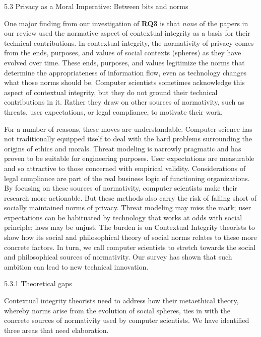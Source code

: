\documentclass[../thesis.tex]{subfiles}
\begin{document}
5.3 Privacy as a Moral Imperative: Between bits and norms

\textcolor[rgb]{0.2,0.2,0.2}{One major finding from our investigation of
}\textbf{\textcolor[rgb]{0.2,0.2,0.2}{RQ3}}\textcolor[rgb]{0.2,0.2,0.2}{
is that }\textit{\textcolor[rgb]{0.2,0.2,0.2}{none}} of the papers in
our review used the normative aspect of contextual integrity as a basis
for their technical contributions. In contextual integrity, the
normativity of privacy comes from the ends, purposes, and values of
social contexts (spheres) as they have evolved over time. These ends,
purposes, and values legitimize the norms that determine the
appropriateness of information flow, even as technology changes what
those norms should be. Computer scientists sometimes acknowledge this
aspect of contextual integrity, but they do not ground their technical
contributions in it. Rather they draw on other sources of normativity,
such as threats, user expectations, or legal compliance, to motivate
their work.

For a number of reasons, these moves are understandable. Computer
science has not traditionally equipped itself to deal with the hard
problems surrounding the origins of ethics and morals. Threat modeling
is narrowly pragmatic and has proven to be suitable for engineering
purposes. User expectations are measurable and so attractive to those
concerned with empirical validity. Considerations of legal compliance
are part of the real business logic of functioning organizations. By
focusing on these sources of normativity, computer scientists make
their research more actionable. But these methods also carry the risk
of falling short of socially maintained norms of privacy. Threat
modeling may miss the mark; user expectations can be habituated by
technology that works at odds with social principle; laws may be
unjust. The burden is on Contextual Integrity theorists to show how its
social and philosophical theory of social norms relates to these more
concrete factors. In turn, we call computer scientists to stretch
towards the social and philosophical sources of normativity. Our survey
has shown that such ambition can lead to new technical innovation.

{\color[rgb]{0.2627451,0.2627451,0.2627451}
5.3.1 Theoretical gaps}

Contextual integrity theorists need to address how their metaethical
theory, whereby norms arise from the evolution of social spheres, ties
in with the concrete sources of normativity used by computer
scientists. We have identified three areas that need elaboration.
\end{document}

